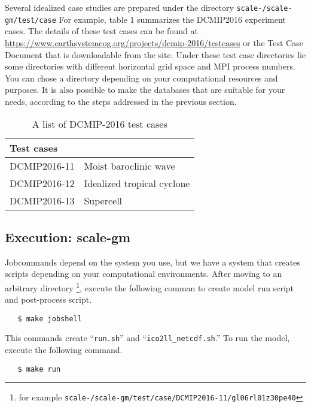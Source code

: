 Several idealized case studies are prepared under the directory 
\noindent \texttt{scale-{\version}/scale-gm/test/case} 
For example, table 1 summarizes the DCMIP2016 experiment cases.
The details of these test cases can be found at 
\url{https://www.earthsystemcog.org/projects/dcmip-2016/testcases}
or the Test Case Document that is downloadable from the site.
Under these test case directories lie some directories with 
different horizontal grid space and MPI process numbers. 
You can chose a directory depending on your computational resources 
and purposes.
It is also possible to make the databases that are suitable for your needs,
according to the steps addressed in the previous section.
 \begin{table}[h]
 \begin{center}
 \caption{A list of DCMIP-2016 test cases}
 \begin{tabularx}{150mm}{|l|X|} \hline
 \rowcolor[gray]{0.9} Test cases \\ \hline
  DCMIP2016-11 & Moist baroclinic wave  \\ \hline
  DCMIP2016-12 & Idealized tropical cyclone \\ \hline
  DCMIP2016-13 & Supercell \\ \hline
 \end{tabularx}
 \end{center}
 \end{table}


\subsection{Execution: scale-gm}

Jobcommands depend on the system you use, but we have a system 
that creates scripts depending on your computational environments.
After moving to an arbitrary directory \footnote{for example
  \texttt{scale-{\version}/scale-gm/test/case/DCMIP2016-11/gl06rl01z30pe40}},
execute the following comman to create model run script and post-process script.

 \begin{verbatim}
   $ make jobshell
 \end{verbatim}

This commands create ``\verb|run.sh|'' and ``\verb|ico2ll_netcdf.sh|.''
To run the model, execute the following command.

 \begin{verbatim}
   $ make run
 \end{verbatim}

